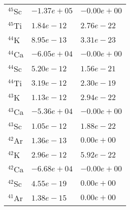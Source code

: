 \begin{tabular}{lll}
 $^{45}$Sc & $-1.37e+05 $                                                       & $-0.00e+00 $                                                          \\
 $^{45}$Ti & $1.84e-12 $                                                        & $2.76e-22 $                                                           \\
 $^{44}$K  & $8.95e-13 $                                                        & $3.31e-23 $                                                           \\
 $^{44}$Ca & $-6.05e+04 $                                                       & $-0.00e+00 $                                                          \\
 $^{44}$Sc & $5.20e-12 $                                                        & $1.56e-21 $                                                           \\
 $^{44}$Ti & $3.19e-12 $                                                        & $2.30e-19 $                                                           \\
 $^{43}$K  & $1.13e-12 $                                                        & $2.94e-22 $                                                           \\
 $^{43}$Ca & $-5.36e+04 $                                                       & $-0.00e+00 $                                                          \\
 $^{43}$Sc & $1.05e-12 $                                                        & $1.88e-22 $                                                           \\
 $^{42}$Ar & $1.36e-13 $                                                        & $0.00e+00 $                                                           \\
 $^{42}$K  & $2.96e-12 $                                                        & $5.92e-22 $                                                           \\
 $^{42}$Ca & $-6.68e+04 $                                                       & $-0.00e+00 $                                                          \\
 $^{42}$Sc & $4.55e-19 $                                                        & $0.00e+00 $                                                           \\
 $^{41}$Ar & $1.38e-15 $                                                        & $0.00e+00 $                                                           \\

\end{tabular}
